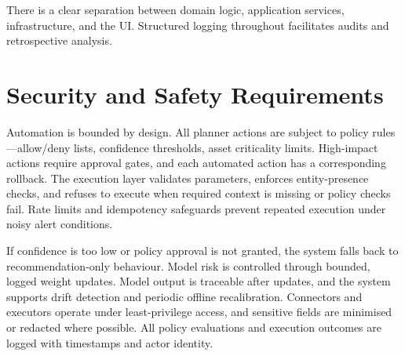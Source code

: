 There is a clear separation between domain logic, application services, infrastructure, and the UI. Structured logging throughout facilitates audits and retrospective analysis.

\section{Security and Safety Requirements}

Automation is bounded by design. All planner actions are subject to policy rules---allow/deny lists, confidence thresholds, asset criticality limits. High-impact actions require approval gates, and each automated action has a corresponding rollback. The execution layer validates parameters, enforces entity-presence checks, and refuses to execute when required context is missing or policy checks fail. Rate limits and idempotency safeguards prevent repeated execution under noisy alert conditions.

If confidence is too low or policy approval is not granted, the system falls back to recommendation-only behaviour. Model risk is controlled through bounded, logged weight updates. Model output is traceable after updates, and the system supports drift detection and periodic offline recalibration. Connectors and executors operate under least-privilege access, and sensitive fields are minimised or redacted where possible. All policy evaluations and execution outcomes are logged with timestamps and actor identity.

